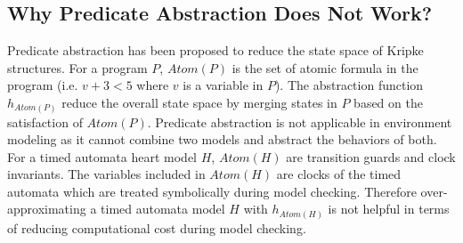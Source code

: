 \subsection{Why Predicate Abstraction Does Not Work?}
Predicate abstraction \cite{predicate} has been proposed to reduce the state space of Kripke structures. For a program $P$, $Atom(P)$ is the set of atomic formula in the program (i.e. $v+3<5$ where $v$ is a variable in $P$). The abstraction function $h_{Atom(P)}$ reduce the overall state space by merging states in $P$ based on the satisfaction of $Atom(P)$. Predicate abstraction is not applicable in environment modeling as it cannot combine two models and abstract the behaviors of both. For a timed automata heart model $H$, $Atom(H)$ are transition guards and clock invariants. The variables included in $Atom(H)$ are clocks of the timed automata which are treated symbolically during model checking. Therefore over-approximating a timed automata model $H$ with $h_{Atom(H)}$ is not helpful in terms of reducing computational cost during model checking.
%
